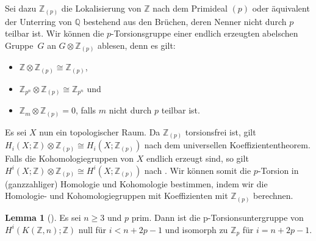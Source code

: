 \documentclass[11pt, a4paper, german]{article}
\theoremstyle{definition}
\newtheorem{lem}{Lemma}
\theoremstyle{remark}
\newcommand{\Z}{\mathbb{Z}} %
\newcommand{\Q}{\mathbb{Q}} %
\begin{document}
Sei dazu $\Z_{(p)}$ die Lokalisierung von $\Z$ nach dem Primideal $(p)$ oder äquivalent der Unterring von $\Q$ bestehend aus den Brüchen, deren Nenner nicht durch $p$ teilbar ist.
Wir können die $p$-Torsionsgruppe einer endlich erzeugten abelschen Gruppe~$G$ an $G \otimes \Z_{(p)}$ ablesen, denn es gilt:
\begin{itemize}
  \item $\Z \otimes \Z_{(p)} \cong \Z_{(p)}$,
  \item $\Z_{p^n} \otimes \Z_{(p)} \cong \Z_{p^n}$ und
  \item $\Z_m \otimes \Z_{(p)} = 0$, falls $m$ nicht durch $p$ teilbar ist.
\end{itemize}

Es sei $X$ nun ein topologischer Raum.
Da $\Z_{(p)}$ torsionsfrei ist, gilt
$H_i(X; \Z) \otimes \Z_{(p)} \cong H_i(X; \Z_{(p)})$ nach dem universellen Koeffiziententheorem.
Falls die Kohomologiegruppen von $X$ endlich erzeugt sind, so gilt
$H^i(X; \Z) \otimes \Z_{(p)} \cong H^i(X; \Z_{(p)})$
nach \cite[\mbox{} Thm 5.5.10]{spanier:at}.
Wir können somit die $p$-Torsion in (ganzzahliger) Homologie und Kohomologie bestimmen, indem wir die Homologie- und Kohomologiegruppen mit Koeffizienten mit $\Z_{(p)}$ berechnen.

\begin{lem}[{\cite[Lem 1.29]{hatcher:ss}}]\label{mod-p-cohomology-kzn}
  Es sei $n \geq 3$ und $p$ prim.
  Dann ist die p-Torsionsuntergruppe von $H^i(K(\Z, n); \Z)$ null für $i < n + 2p - 1$ und isomorph zu $\Z_p$ für $i = n + 2p - 1$.
\end{lem}
\end{document}
